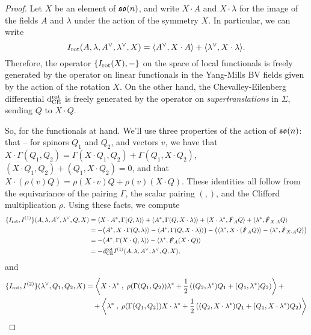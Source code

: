 \documentclass[10pt, oneside]{article}
\begin{document}
\begin{proof}
Let $X$ be an element of $\mathfrak{so}(n)$, and write $X \cdot A$ and $X \cdot \lambda$ for the image of the fields $A$ and $\lambda$ under the action of the symmetry $X$.  In particular, we can write
\[I_{\mathrm{rot}}(A,\lambda, A^\vee, \lambda^\vee, X) = \langle A^\vee, X \cdot A \rangle + \langle \lambda^\vee, X \cdot \lambda \rangle.
\]
Therefore, the operator $\{I_{\mathrm{rot}}(X), -\}$ on the space of local functionals is freely generated by the operator on linear functionals in the Yang-Mills BV fields given by the action of the rotation $X$.  On the other hand, the Chevalley-Eilenberg differential ${\rm d}^{\mathrm{rot}}_{\mathrm{CE}}$ is freely generated by the operator on \emph{supertranslations} in $\Sigma$, sending $Q$ to $X \cdot Q$.

So, for the functionals at hand.  We'll use three properties of the action of $\mathfrak{so}(n)$: that -- for spinors $Q_1$ and  $Q_2$, and vectors $v$, we have that $X \cdot \Gamma(Q_1, Q_2) = \Gamma(X \cdot Q_1, Q_2) + \Gamma(Q_1, X \cdot Q_2)$,  $(X \cdot Q_1, Q_2) + (Q_1, X \cdot Q_2) = 0$, and that $X \cdot (\rho(v)Q) = \rho(X \cdot v)Q + \rho(v)(X \cdot Q)$.  These identities all follow from the equivariance of the pairing $\Gamma$, the scalar pairing $(,)$, and the Clifford multiplication $\rho$.  Using these facts, we compute
\begin{align*}
\{I_{\mathrm{rot}}, I^{(1)}\}(A,\lambda, A^\vee, \lambda^\vee, Q, X) &= \langle X \cdot A^* , \Gamma(Q, \lambda)\rangle + \langle A^* , \Gamma(Q, X \cdot \lambda)\rangle + \langle X \cdot \lambda^*, \slashed{F}_A Q\rangle +  \langle\lambda^*, \slashed{F}_{X \cdot A} Q\rangle \\
&= -\big(A^* , X \cdot \Gamma(Q, \lambda)\rangle - \langle A^* , \Gamma(Q, X \cdot \lambda)\rangle\big) - \big(\langle\lambda^*, X \cdot( \slashed{F}_A Q)\rangle -  \langle\lambda^*, \slashed{F}_{X \cdot A} Q\rangle\big)\\
&= - \langle A^* , \Gamma(X \cdot Q, \lambda)\rangle - \langle\lambda^*, \slashed{F}_A (X \cdot Q)\rangle\\
&= -{\rm d}^{\mathrm{rot}}_{\mathrm{CE}} I^{(1)}(A,\lambda, A^\vee, \lambda^\vee, Q, X),
\end{align*}
and
\begin{align*}
\{I_{\mr{rot}}, I^{(2)}\}(\lambda^\vee, Q_1, Q_2, X) &= \left\<X \cdot \lambda^* \;,\; \rho(\Gamma(Q_1,Q_2)) \lambda^* + \frac 12 \left((Q_2, \lambda^*)Q_1 + (Q_1, \lambda^*)Q_2\right)\right\> + \\
&\quad + \left\<\lambda^* \;,\; \rho(\Gamma(Q_1,Q_2)) X \cdot \lambda^* + \frac 12 \left((Q_2, X \cdot \lambda^*)Q_1 + (Q_1, X \cdot \lambda^*)Q_2\right)\right\> \\

\end{align*}
\end{proof}
\end{document}
